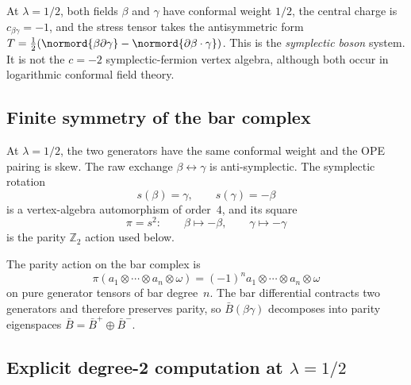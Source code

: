 At $\lambda = 1/2$, both fields $\beta$ and $\gamma$ have conformal
weight $1/2$, the central charge is $c_{\beta\gamma} = -1$, and the
stress tensor takes the antisymmetric form
$T = \frac{1}{2}(\normord{\beta\partial\gamma}
- \normord{\partial\beta \cdot \gamma})$.
This is the \emph{symplectic boson} system. It is not the $c=-2$
symplectic-fermion vertex algebra, although both occur in logarithmic
conformal field theory.

\subsection{Finite symmetry of the bar
complex}

\begin{definition}
\label{def:Z2-action-symplectic}
At $\lambda = 1/2$, the two generators have the same conformal
weight and the OPE pairing is skew. The raw exchange
$\beta\leftrightarrow\gamma$ is anti-symplectic. The symplectic
rotation
\[
s(\beta)=\gamma,\qquad s(\gamma)=-\beta
\]
is a vertex-algebra automorphism of order~$4$, and its square
\[
\pi=s^2:\qquad \beta\mapsto-\beta,\qquad \gamma\mapsto-\gamma
\]
is the parity $\mathbb Z_2$ action used below.
\end{definition}

The parity action on the bar complex is
\begin{equation}\label{eq:Z2-on-bar}
\pi(a_1 \otimes \cdots \otimes a_n \otimes \omega)
= (-1)^n a_1 \otimes \cdots \otimes a_n \otimes \omega
\end{equation}
on pure generator tensors of bar degree~$n$. The bar differential
contracts two generators and therefore preserves parity, so
$\bar{B}(\beta\gamma)$ decomposes into parity eigenspaces
$\bar{B} = \bar{B}^+ \oplus \bar{B}^-$.

\subsection{Explicit degree-2 computation at \texorpdfstring{$\lambda = 1/2$}{lambda = 1/2}}

